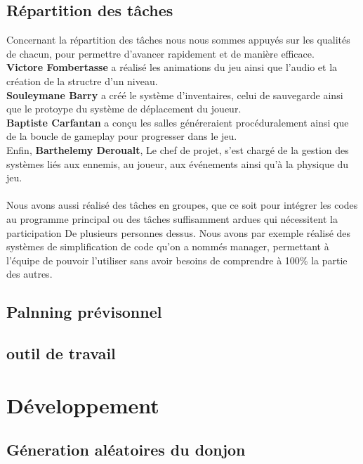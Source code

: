 \documentclass[a4paper,11pt]{article}
\begin{document}
\subsection{Répartition des tâches}

    Concernant la répartition des tâches nous nous sommes appuyés sur les qualités de chacun, pour permettre d'avancer rapidement et de manière \mbox{efficace.}\\
    \textbf{Victore Fombertasse} a réalisé les animations du jeu ainsi que l'audio et la création de la structre d'un niveau.\\
    \textbf{Souleymane Barry} a créé le système d'inventaires, celui de sauvegarde ainsi que le protoype du système de déplacement du joueur.\\
    \textbf{Baptiste Carfantan} a conçu les salles généreraient procéduralement ainsi que de la boucle de gameplay pour progresser dans le jeu.\\
    Enfin, \textbf{Barthelemy Deroualt}, Le chef de projet, s'est chargé de la gestion des systèmes liés aux ennemis, au joueur, aux événements
    ainsi qu'à la physique du jeu.\\
    \\
    Nous avons aussi réalisé des tâches en groupes, que ce soit pour intégrer les codes au programme principal ou des tâches suffisamment ardues qui nécessitent la participation
    De plusieurs personnes dessus. Nous avons par exemple réalisé des systèmes de simplification de code qu'on a nommés manager, permettant à l'équipe de pouvoir l'utiliser sans 
    avoir besoins de comprendre à 100\% la partie des autres.



\subsection{Palnning prévisonnel}

\subsection{outil de travail}

\section{Développement}

\subsection{Géneration aléatoires du donjon}
\end{document}
